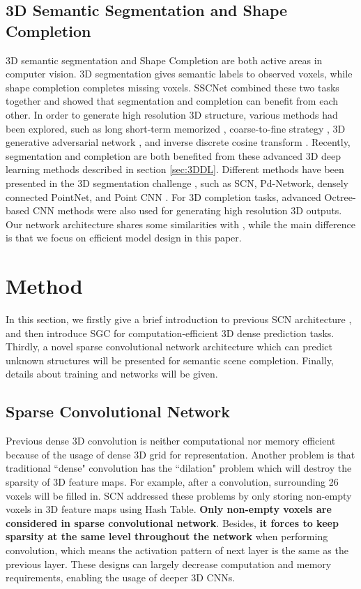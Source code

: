 \documentclass[runningheads]{llncs}
\begin{document}
\subsection{3D Semantic Segmentation and Shape Completion}
3D semantic segmentation \cite{Yi2017,chang2017matterport3d,Liu2017,Qi2017} and Shape Completion \cite{Wu2015,Firman2016,Dai2016,Han2017} are both active areas in computer vision. 3D segmentation gives semantic labels to observed voxels, while shape completion completes missing voxels. SSCNet \cite{song2016semantic} combined these two tasks together and showed that segmentation and completion can benefit from each other. In order to generate high resolution 3D structure, various methods had been explored, such as long short-term memorized \cite{Han2017}, coarse-to-fine strategy \cite{dai2018scancomplete}, 3D generative adversarial network \cite{yang20183d}, and inverse discrete cosine transform \cite{johnston2017scaling}.
Recently, segmentation and completion are both benefited from these advanced 3D deep learning methods described in section \ref{sec:3DDL}. Different methods have been presented in the 3D segmentation challenge \cite{Yi2017ShapeNet}, such as SCN, Pd-Network, densely connected PointNet, and Point CNN \cite{2018arXiv180107791L}. For 3D completion tasks, advanced Octree-based CNN methods \cite{Riegler2017,Tatarchenko2017,Hane2017} were also used for generating high resolution 3D outputs. Our network architecture shares some similarities with \cite{Riegler2017,Tatarchenko2017},
while the main difference is that we focus on efficient model design in this paper.


\section{Method}
In this section, we firstly give a brief introduction to previous SCN architecture \cite{2017arXiv170601307G}, and then introduce SGC for computation-efficient 3D dense prediction tasks. Thirdly, a novel sparse convolutional network architecture which can predict unknown structures will be presented for semantic scene completion. Finally, details about training and networks will be given.

\subsection{Sparse Convolutional Network}
\label{sec::sparse_conv}
Previous dense 3D convolution is neither computational nor memory efficient because of the usage of dense 3D grid for representation.
Another problem is that traditional ``dense" convolution has the ``dilation" problem \cite{2017arXiv170601307G} which will destroy the sparsity of 3D feature maps.
For example, after a  convolution, surrounding 26 voxels will be filled in.
SCN addressed these problems by only storing non-empty voxels in 3D feature maps using Hash Table. \textbf{Only non-empty voxels are considered in sparse convolutional network}. Besides, \textbf{it forces to keep sparsity at the same level throughout the network} when performing convolution, which means the activation pattern of next layer is the same as the previous layer. These designs can largely decrease computation and memory requirements, enabling the usage of deeper 3D CNNs.
\end{document}
